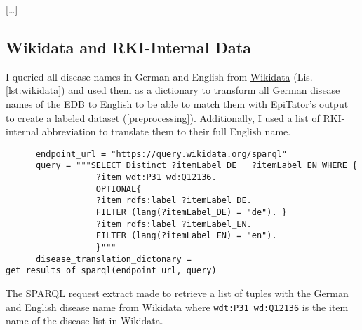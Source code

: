   [\dots]



\subsection{Wikidata and RKI-Internal Data}\label{wikidata}
  I queried all disease names in German and English from \href{https://www.wikidata.org/wiki/Wikidata:Main_Page}{Wikidata} (Lis. \ref{lst:wikidata}) and used them as a dictionary to transform all German disease names of the EDB to English to be able to match them with EpiTator's output to create a labeled dataset (\ref{preprocessing}).
  Additionally, I used a list of RKI-internal abbreviation to translate them to their full English name.

  \begin{listing}[h]
    \begin{verbatim}
      endpoint_url = "https://query.wikidata.org/sparql"
      query = """SELECT Distinct ?itemLabel_DE   ?itemLabel_EN WHERE {
                  ?item wdt:P31 wd:Q12136.
                  OPTIONAL{
                  ?item rdfs:label ?itemLabel_DE.
                  FILTER (lang(?itemLabel_DE) = "de"). }
                  ?item rdfs:label ?itemLabel_EN.
                  FILTER (lang(?itemLabel_EN) = "en").
                  }"""
      disease_translation_dictonary = get_results_of_sparql(endpoint_url, query)
    \end{verbatim}
    \caption{The SPARQL request extract made to retrieve a list of tuples with the German and English disease name from Wikidata where \texttt{wdt:P31 wd:Q12136} is the item name of the disease list in Wikidata.}
    \label{lst:wikidata}
  \end{listing}


